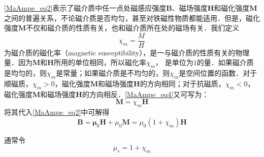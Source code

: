 \autoref{MaAmpe_eq2}表示了磁介质中任一点处磁感应强度$\mathbf B$、磁场强度$\mathbf H$和磁化强度$\mathbf M $之间的普遍关系，不论磁介质是否均匀，甚至对铁磁性物质都能适用．但是，磁化强度$\mathbf M $不仅和磁介质的性质有关，也和磁介质所在处的磁场有关．我们定义
\begin{equation} \label{MaAmpe_eq4}
\chi_{m}=\frac{M}{H}
\end{equation}
为磁介质的磁化率（magnetic susceptibility），是一与磁介质的性质有关的物理量．因为$\mathbf M $和$\mathbf H $所用的单位相同，所以磁化率$\chi_m$， 是单位为$1 $的量．如果磁介质是均匀的，则$\chi_m$是常量；如果磁介质是不均匀的，则$\chi_m$是空间位置的函数．对于顺磁质，$\chi_m>0$，磁化强度$\mathbf M $和磁场强度$\mathbf H $的方向相同；对于抗磁质，$\chi_m<0$，磁化强度$\mathbf M $和磁场强度$\mathbf H $的方向相反．\autoref{MaAmpe_eq4}又可写为：
\begin{equation}
\mathbf M = \chi_m\mathbf H
\end{equation}
将其代入\autoref{MaAmpe_eq2}中可解得
\begin{equation}
\mathbf{B}=\mathbf{\mu}_{0} \mathbf{H}+\mu_{0} \mathbf{M}=\mu_{0}\left(1+\chi_{{m}}\right) \mathbf{H}
\end{equation}

通常令
\begin{equation}
\mu_{{r}}=1+\chi_{m}
\end{equation}